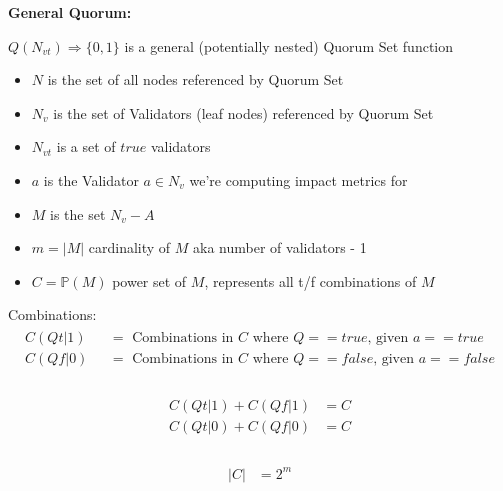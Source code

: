 \documentclass[10pt]{article}
\begin{document}
\newcommand{\powerset}[1]{\mathbb{P}(#1)}
\newcommand{\cardinality}[1]{\left\vert{#1}\right\vert}

\newcommand{\tgt}[0]{ \cardinality{ C(Qt|1) } }
\newcommand{\tgf}[0]{ \cardinality{ C(Qt|0) } }
\newcommand{\fgt}[0]{ \cardinality{ C(Qf|1) } }
\newcommand{\fgf}[0]{ \cardinality{ C(Qf|0) } }
\newcommand{\effected}[0]{ \tgt + \fgf - 2^m }


\textbf{General Quorum:}\\\par
$Q(N_{vt}) \Rightarrow \{0,1\}$ is a general (potentially nested) Quorum Set function

\begin{itemize}
  \item $N$ is the set of all nodes referenced by Quorum Set
  \item $N_v$ is the set of Validators (leaf nodes) referenced by Quorum Set
  \item $N_{vt}$ is a set of $true$ validators
  \item $a$ is the Validator $a \in N_v$  we're computing impact metrics for
  \item $M$ is the set $N_v-A$
  \item $m = \cardinality{M}$ cardinality of $M$ aka number of validators - 1
  \item $C = \powerset{M}$ power set of $M$, represents all t/f combinations of $M$
\end{itemize}


Combinations:
\begin{align}
\begin{split}
  C(Qt|1) \text{ } &= \text{ Combinations in } C \text{ where } Q == true \text{, given } a == true \\
  C(Qf|0) \text{ } &= \text{ Combinations in } C \text{ where } Q == false \text{, given } a == false \\
\end{split}
\end{align}

\begin{align}
\begin{split}
  C(Qt|1) + C(Qf|1) &= C \\
  C(Qt|0) + C(Qf|0) &= C \\
\end{split}
\end{align}

\begin{align}
\begin{split}
  \cardinality{C} &= 2^m
\end{split}
\end{align}
\end{document}
